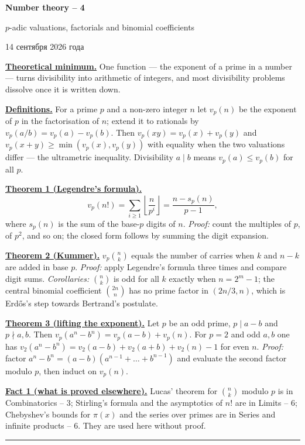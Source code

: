 \documentclass[11pt,a4paper]{article}
\newcommand{\head}[1]{\par\bigskip\noindent\textbf{\underline{#1}}\quad}
\newcommand{\rudate}{14 сентября 2026 года}
\newcommand{\sheettitle}[3]{%
  \begin{center}
  {\huge\bfseries #1\par}\vspace{1.2em}
  {\Large #2\par}\vspace{0.8em}
  \if\relax\detokenize{#3}\relax\else{\Large #3\par}\vspace{0.8em}\fi
  {\foreignlanguage{russian}{\rudate}\par}
  \end{center}\vspace{0.5em}}
\newcommand{\fl}[1]{\left\lfloor #1\right\rfloor}
\begin{document}
\sheettitle{Number theory -- 4}{$p$-adic valuations, factorials and binomial coefficients}{}

\head{Theoretical minimum.} One function --- the exponent of a prime in a number --- turns
divisibility into arithmetic of integers, and most divisibility problems dissolve once it is written
down.

\head{Definitions.} For a prime $p$ and a non-zero integer $n$ let $v_p(n)$ be the exponent of $p$
in the factorisation of $n$; extend it to rationals by $v_p(a/b)=v_p(a)-v_p(b)$. Then
$v_p(xy)=v_p(x)+v_p(y)$ and $v_p(x+y)\geqslant\min(v_p(x),v_p(y))$ with equality when the two
valuations differ --- the ultrametric inequality. Divisibility $a\mid b$ means
$v_p(a)\leqslant v_p(b)$ for all $p$.

\head{Theorem 1 (Legendre's formula).}
\[
v_p(n!)=\sum_{i\geqslant1}\fl{\frac{n}{p^i}}=\frac{n-s_p(n)}{p-1},
\]
where $s_p(n)$ is the sum of the base-$p$ digits of $n$. \emph{Proof:} count the multiples of $p$,
of $p^2$, and so on; the closed form follows by summing the digit expansion.

\head{Theorem 2 (Kummer).} $v_p\binom nk$ equals the number of carries when $k$ and $n-k$ are added
in base $p$. \emph{Proof:} apply Legendre's formula three times and compare digit sums.
\emph{Corollaries:} $\binom nk$ is odd for all $k$ exactly when $n=2^m-1$; the central binomial
coefficient $\binom{2n}n$ has no prime factor in $(2n/3,n)$, which is Erd\H{o}s's step towards
Bertrand's postulate.

\head{Theorem 3 (lifting the exponent).} Let $p$ be an odd prime, $p\mid a-b$ and $p\nmid a,b$.
Then $v_p(a^n-b^n)=v_p(a-b)+v_p(n)$. For $p=2$ and odd $a,b$ one has
$v_2(a^n-b^n)=v_2(a-b)+v_2(a+b)+v_2(n)-1$ for even $n$. \emph{Proof:} factor
$a^n-b^n=(a-b)(a^{n-1}+\dots+b^{n-1})$ and evaluate the second factor modulo $p$, then induct on
$v_p(n)$.

\head{Fact 1 (what is proved elsewhere).} Lucas' theorem for $\binom nk$ modulo $p$ is in
Combinatorics -- 3; Stirling's formula and the asymptotics of $n!$ are in Limits -- 6; Chebyshev's
bounds for $\pi(x)$ and the series over primes are in Series and infinite products -- 6. They are
used here without proof.

\medskip\noindent\rule{\linewidth}{0.4pt}
\end{document}
